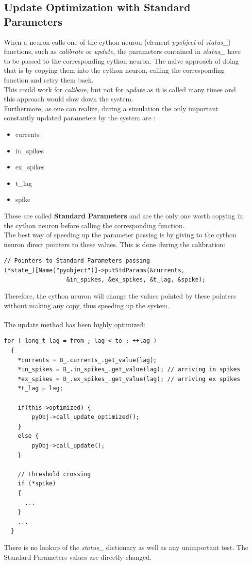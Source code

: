 \documentclass{article}
\begin{document}
\subsection{Update Optimization with Standard Parameters}
When a neuron calls one of the cython neuron (element \emph{pyobject} of \emph{status\_}) functions, such as \emph{calibrate} or \emph{update}, the parameters contained in \emph{status\_} have to be passed to the corresponding cython neuron. The naive approach of doing that is by copying them into the cython neuron, calling the corresponding function and retry them back.\\
This could work for \emph{calibare}, but not for \emph{update} as it is called many times and this approach would slow down the system. \\
Furthermore, as one can realize, during a simulation the only important constantly updated parameters by the system are :\\
\begin{itemize}
\item currents
\item in\_spikes
\item ex\_spikes
\item t\_lag
\item spike
\end{itemize}
These are called \textbf{Standard Parameters} and are the only one worth copying in the cython neuron before calling the corresponding function.\\
The best way of speeding up the parameter passing is by giving to the cython neuron direct pointers to these values. This is done during the calibration:
\begin{verbatim}
// Pointers to Standard Parameters passing
(*state_)[Name("pyobject")]->putStdParams(&currents, 
                  &in_spikes, &ex_spikes, &t_lag, &spike);
\end{verbatim}
Therefore, the cython neuron will change the values pointed by these pointers without making any copy, thus speeding up the system. \\ \\

The update method has been highly optimized:
\begin{verbatim}  
for ( long_t lag = from ; lag < to ; ++lag )
  {
	*currents = B_.currents_.get_value(lag);
    *in_spikes = B_.in_spikes_.get_value(lag); // arriving in spikes
    *ex_spikes = B_.ex_spikes_.get_value(lag); // arriving ex spikes
    *t_lag = lag;

    if(this->optimized) {
        pyObj->call_update_optimized();
    }
    else {
        pyObj->call_update();
    }

    // threshold crossing
    if (*spike)
    {
      ...
    }
    ...
  }
\end{verbatim}
There is no lookup of the \emph{status\_} dictionary as well as any unimportant test. The Standard Parameters values are directly changed.
\end{document}
